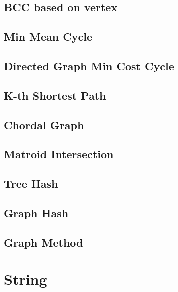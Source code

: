 \documentclass[a4paper,10pt,twocolumn,oneside]{article}
\begin{document}
\subsection{BCC based on vertex}


\subsection{Min Mean Cycle}


\subsection{Directed Graph Min Cost Cycle}


\subsection{K-th Shortest Path}


\subsection{Chordal Graph}


\subsection{Matroid Intersection}


\subsection{Tree Hash}


\subsection{Graph Hash}


\subsection{Graph Method}


\section{String}
\end{document}
